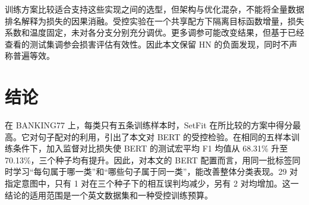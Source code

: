 \documentclass[runningheads]{llncs}
\begin{document}
训练方案比较适合支持这些实现之间的选型，但架构与优化混杂，不能将全量数据排名解释为损失的因果消融。受控实验在一个共享配方下隔离目标函数增量，损失系数和温度固定，未对各分支分别充分调优。更多调参可能改变结果，但基于已经查看的测试集调参会损害评估有效性。因此本文保留 HN 的负面发现，同时不声称普遍等效。

\section{结论}
在 BANKING77 上，每类只有五条训练样本时，SetFit 在所比较的方案中得分最高。它对句子配对的利用，引出了本文对 BERT 的受控检验。在相同的五样本训练条件下，加入监督对比损失使 BERT 的测试宏平均 F1 均值从 68.31\% 升至 70.13\%，三个种子均有提升。因此，对本文的 BERT 配置而言，用同一批标签同时学习“每句属于哪一类”和“哪些句子属于同一类”，能改善整体分类表现。29 对指定意图中，只有 1 对在三个种子下的相互误判均减少，另有 2 对均增加。这一结论的适用范围是一个英文数据集和一种受控训练预算。
\label{mainend}
\clearpage

\end{document}

